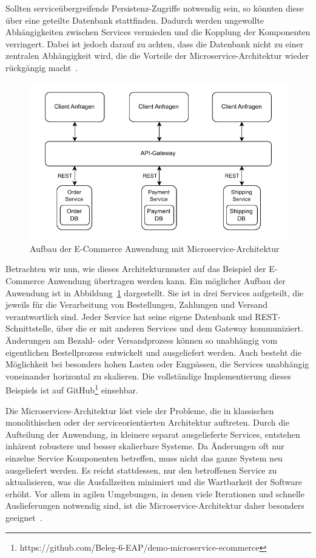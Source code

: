 \documentclass[acmtog]{acmart}
\begin{document}
Sollten serviceübergreifende Persistenz-Zugriffe notwendig sein, so könnten diese über eine geteilte Datenbank stattfinden.
Dadurch werden ungewollte Abhängigkeiten zwischen Services vermieden und die Kopplung der Komponenten verringert.
Dabei ist jedoch darauf zu achten, dass die Datenbank nicht zu einer zentralen Abhängigkeit wird, die die Vorteile der Microservice-Architektur wieder rückgängig macht~\cite[33]{architecturePatterns}.

\begin{figure}[!h]
  \centering
  \includegraphics[width=\linewidth]{images/microservices/ecommerce-microservices}
  \caption{Aufbau der E-Commerce Anwendung mit Microservice-Architektur}
  \label{fig:ecommerce-microservices}
\end{figure}

Betrachten wir nun, wie dieses Architekturmuster auf das Beispiel der E-Commerce Anwendung übertragen werden kann.
Ein möglicher Aufbau der Anwendung ist in Abbildung~\ref{fig:ecommerce-microservices} dargestellt.
Sie ist in drei Services aufgeteilt, die jeweils für die Verarbeitung von Bestellungen, Zahlungen und Versand verantwortlich sind.
Jeder Service hat seine eigene Datenbank und REST-Schnittstelle, über die er mit anderen Services und dem Gateway kommuniziert.
Änderungen am Bezahl- oder Versandprozess können so unabhängig vom eigentlichen Bestellprozess entwickelt und ausgeliefert werden.
Auch besteht die Möglichkeit bei besonders hohen Lasten oder Engpässen, die Services unabhängig voneinander horizontal zu skalieren.
Die vollständige Implementierung dieses Beispiels ist auf GitHub\footnote{https://github.com/Beleg-6-EAP/demo-microservice-ecommerce} einsehbar.

Die Microservices-Architektur löst viele der Probleme, die in klassischen monolithischen oder der serviceorientierten Architektur auftreten.
Durch die Aufteilung der Anwendung, in kleinere separat ausgelieferte Services, entstehen inhärent robustere und besser skalierbare Systeme.
Da Änderungen oft nur einzelne Service Komponenten betreffen, muss nicht das ganze System neu ausgeliefert werden.
Es reicht stattdessen, nur den betroffenen Service zu aktualisieren, was die Ausfallzeiten minimiert und die Wartbarkeit der Software erhöht.
Vor allem in agilen Umgebungen, in denen viele Iterationen und schnelle Auslieferungen notwendig sind, ist die Microservice-Architektur daher besonders geeignet~\cite[33]{architecturePatterns}.
\end{document}
